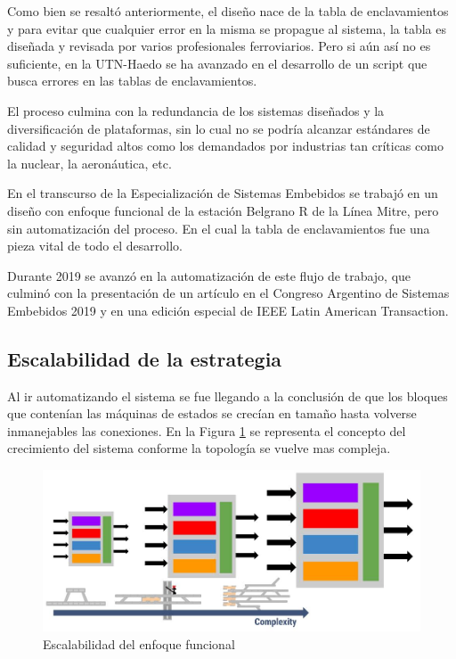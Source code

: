 		Como bien se resaltó anteriormente, el diseño nace de la tabla de enclavamientos y para evitar que cualquier error en la misma se propague al sistema, la tabla es diseñada y revisada por varios profesionales ferroviarios. Pero si aún así no es suficiente, en la UTN-Haedo se ha avanzado en el desarrollo de un script que busca errores en las tablas de enclavamientos.
		
		El proceso culmina con la redundancia de los sistemas diseñados y la diversificación de plataformas, sin lo cual no se podría alcanzar estándares de calidad y seguridad altos como los demandados por industrias tan críticas como la nuclear, la aeronáutica, etc. 
		
		En el transcurso de la Especialización de Sistemas Embebidos se trabajó en un diseño con enfoque funcional de la estación Belgrano R de la Línea Mitre, pero sin automatización del proceso. En el cual la tabla de enclavamientos fue una pieza vital de todo el desarrollo.
		
		Durante 2019 se avanzó en la automatización de este flujo de trabajo, que culminó con la presentación de un artículo en el Congreso Argentino de Sistemas Embebidos 2019 y en una edición especial de IEEE Latin American Transaction.
		
	\subsection{Escalabilidad de la estrategia}	
		
		Al ir automatizando el sistema se fue llegando a la conclusión de que los bloques que contenían las máquinas de estados se crecían en tamaño hasta volverse inmanejables las conexiones. En la Figura \ref{fig:Escala_Funcional} se representa el concepto del crecimiento del sistema conforme la topología se vuelve mas compleja.		
					
		\begin{figure}[h]
		\centering
			\includegraphics[scale=.4]{./Figures/Funcional_complejidad}
			\caption{Escalabilidad del enfoque funcional}
			\label{fig:Escala_Funcional}
		\end{figure}
		
